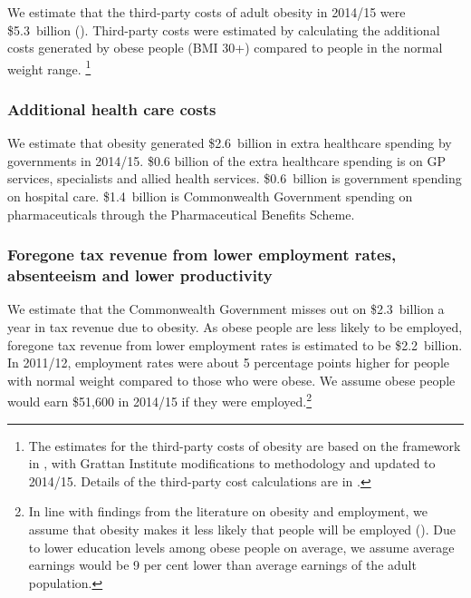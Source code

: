 \documentclass[embargoed]{grattan}
\begin{document}
We estimate that the third-party costs of adult obesity in 2014/15 were \$5.3~billion ().
Third-party costs were estimated by calculating the additional costs generated by obese people (BMI 30+) compared to people in the normal weight range.%
\footnote{The estimates for the third-party costs of obesity are based on the framework in \textcite{PwC2015Weighingcostobesity}, with Grattan Institute modifications to methodology and updated to 2014/15.
Details of the third-party cost calculations are in .}

\subsubsection{Additional health care costs}\label{additional-health-care-costs}

We estimate that obesity generated \$2.6~billion in extra healthcare spending by governments in 2014/15. \$0.6 billion of the extra healthcare spending is on GP services, specialists and allied health services. \$0.6~billion is government spending on hospital care. \$1.4~billion is Commonwealth Government spending on pharmaceuticals through the Pharmaceutical Benefits Scheme.

\subsubsection{Foregone tax revenue from lower employment rates, absenteeism and lower productivity}\label{foregone-tax-revenue-from-lower-employment-rates-absenteeism-and-lower-productivity}

We estimate that the Commonwealth Government misses out on \$2.3~billion a year in tax revenue due to obesity. As obese people are less likely to be employed, foregone tax revenue from lower employment rates is estimated to be \$2.2~billion.
In 2011/12, employment rates were about 5 percentage points higher for people with normal weight compared to those who were obese.
We assume obese people would earn \$51,600 in 2014/15 if they were employed.\footnote{In line with findings from the literature on obesity and employment, we assume that obesity makes it less likely that people will be employed (\textcites{Boeckerman2016EffectWeightLabor}{Reichert2015Obesityweightloss}{Cawley2015economyscalesselective}{Rooth2009Obesityattractivenessdifferential}).
Due to lower education levels among obese people on average, we assume average earnings would be 9 per cent lower than average earnings of the adult population.}
\end{document}
